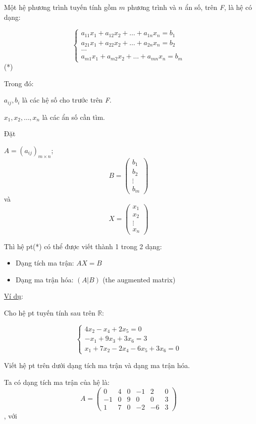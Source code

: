\documentclass[12pt,a4paper]{article}
\let\ul\uline
\begin{document}
Một hệ phương trình tuyến tính gồm $m$
phương trình và $n$ ẩn số, trên
\emph{F}, là hệ có dạng:

$$\begin{cases} a_{11}x_1 + a_{12}x_2 + \dots + a_{1n}x_n = b_1 \\ a_{21}x_1 + a_{22}x_2 + \dots + a_{2n}x_n = b_2 \\ \dots \\ a_{m1}x_1 + a_{m2}x_2 + \dots + a_{mn}x_n = b_m \end{cases}$$ (*)

Trong đó:

$a_{ij}, b_i$ là các hệ số cho trước trên
\emph{F}.

$x_1, x_2, \dots, x_n$ là các ẩn số cần tìm.

Đặt

$A = (a_{ij})_{m \times n}$; $$B = \begin{pmatrix} b_1 \\ b_2 \\ \vdots \\ b_m \end{pmatrix}$$
và $$X = \begin{pmatrix} x_1 \\ x_2 \\ \vdots \\ x_n \end{pmatrix}$$

Thì hệ pt(*) có thể được viết thành 1 trong 2 dạng:

\begin{itemize}
\item
  Dạng tích ma trận: $AX = B$
\item
  Dạng ma trận hóa: $(A|B)$ (the augmented
  matrix)
\end{itemize}

\ul{Ví dụ}:

Cho hệ pt tuyến tính sau trên $\mathbb{R}$:

$$\begin{cases} 4x_2 - x_4 + 2x_5 = 0 \\ -x_1 + 9x_3 + 3x_6 = 3 \\ x_1 + 7x_2 - 2x_4 - 6x_5 + 3x_6 = 0 \end{cases}$$

Viết hệ pt trên dưới dạng tích ma trận và dạng ma trận hóa.

Ta có dạng tích ma trận của hệ là: $$A = \begin{pmatrix} 0 & 4 & 0 & -1 & 2 & 0 \\ -1 & 0 & 9 & 0 & 0 & 3 \\ 1 & 7 & 0 & -2 & -6 & 3 \end{pmatrix}$$,
với
\end{document}
